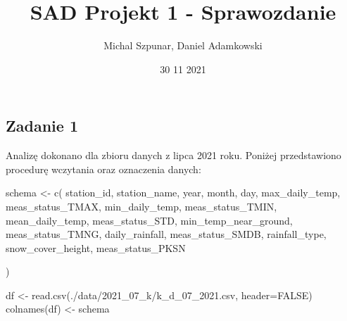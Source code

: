 \documentclass[
]{article}
\title{SAD Projekt 1 - Sprawozdanie}
\author{Michal Szpunar, Daniel Adamkowski}
\date{30 11 2021}
\newenvironment{Shaded}{\begin{snugshade}}{\end{snugshade}}
\newcommand{\AttributeTok}[1]{\textcolor[rgb]{0.77,0.63,0.00}{#1}}
\newcommand{\ConstantTok}[1]{\textcolor[rgb]{0.00,0.00,0.00}{#1}}
\newcommand{\FunctionTok}[1]{\textcolor[rgb]{0.00,0.00,0.00}{#1}}
\newcommand{\NormalTok}[1]{#1}
\newcommand{\OtherTok}[1]{\textcolor[rgb]{0.56,0.35,0.01}{#1}}
\newcommand{\StringTok}[1]{\textcolor[rgb]{0.31,0.60,0.02}{#1}}
\begin{document}
\maketitle

\hypertarget{zadanie-1}{%
\subsection{Zadanie 1}\label{zadanie-1}}

Analizę dokonano dla zbioru danych z lipca 2021 roku. Poniżej
przedstawiono procedurę wczytania oraz oznaczenia danych:

\begin{Shaded}
\begin{Highlighting}[]
\NormalTok{schema }\OtherTok{\textless{}{-}} \FunctionTok{c}\NormalTok{(}
  \StringTok{\textquotesingle{}station\_id\textquotesingle{}}\NormalTok{,}
  \StringTok{\textquotesingle{}station\_name\textquotesingle{}}\NormalTok{,}
  \StringTok{\textquotesingle{}year\textquotesingle{}}\NormalTok{,}
  \StringTok{\textquotesingle{}month\textquotesingle{}}\NormalTok{,}
  \StringTok{\textquotesingle{}day\textquotesingle{}}\NormalTok{,}
  \StringTok{\textquotesingle{}max\_daily\_temp\textquotesingle{}}\NormalTok{,}
  \StringTok{\textquotesingle{}meas\_status\_TMAX\textquotesingle{}}\NormalTok{,}
  \StringTok{\textquotesingle{}min\_daily\_temp\textquotesingle{}}\NormalTok{,}
  \StringTok{\textquotesingle{}meas\_status\_TMIN\textquotesingle{}}\NormalTok{,}
  \StringTok{\textquotesingle{}mean\_daily\_temp\textquotesingle{}}\NormalTok{,}
  \StringTok{\textquotesingle{}meas\_status\_STD\textquotesingle{}}\NormalTok{,}
  \StringTok{\textquotesingle{}min\_temp\_near\_ground\textquotesingle{}}\NormalTok{,}
  \StringTok{\textquotesingle{}meas\_status\_TMNG\textquotesingle{}}\NormalTok{,}
  \StringTok{\textquotesingle{}daily\_rainfall\textquotesingle{}}\NormalTok{,}
  \StringTok{\textquotesingle{}meas\_status\_SMDB\textquotesingle{}}\NormalTok{,}
  \StringTok{\textquotesingle{}rainfall\_type\textquotesingle{}}\NormalTok{,}
  \StringTok{\textquotesingle{}snow\_cover\_height\textquotesingle{}}\NormalTok{,}
  \StringTok{\textquotesingle{}meas\_status\_PKSN\textquotesingle{}}
  
\NormalTok{)}

\NormalTok{df }\OtherTok{\textless{}{-}} \FunctionTok{read.csv}\NormalTok{(}\StringTok{\textquotesingle{}./data/2021\_07\_k/k\_d\_07\_2021.csv\textquotesingle{}}\NormalTok{, }\AttributeTok{header=}\ConstantTok{FALSE}\NormalTok{)}
\FunctionTok{colnames}\NormalTok{(df) }\OtherTok{\textless{}{-}}\NormalTok{ schema}
\end{Highlighting}
\end{Shaded}
\end{document}
